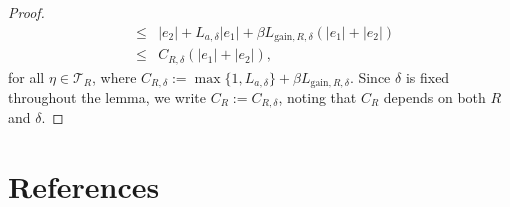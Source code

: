 \documentclass[journal,twoside,web]{ieeecolor}
\begin{document}
\begin{proof}
\begin{eqnarray}
&\le&
|e_2|+L_{a,\delta}|e_1|+\beta L_{\mathrm{gain},R,\delta}(|e_1|+|e_2|) \nonumber\\
&\le&
C_{R,\delta}(|e_1|+|e_2|),
\end{eqnarray}
for all $\eta\in\mathcal T_R$, where $C_{R,\delta}:=\max\{1,L_{a,\delta}\}+\beta L_{\mathrm{gain},R,\delta}$. Since $\delta$ is fixed throughout the lemma, we write $C_R := C_{R,\delta}$, noting that $C_R$ depends on both $R$ and $\delta$.
\end{proof}

\section*{References}

\vspace*{-1.5\baselineskip}





\balance
\vspace*{-1.5\baselineskip}
\end{document}
